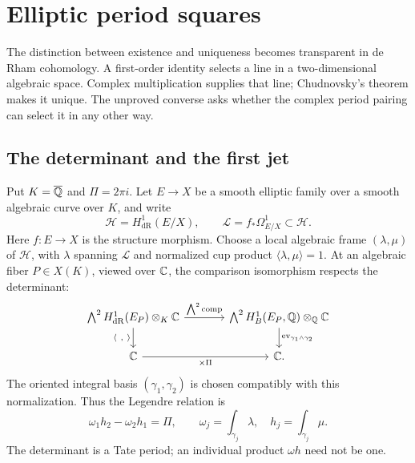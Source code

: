 \section{Elliptic period squares}\label{sec:general-period-square}

The distinction between existence and uniqueness becomes transparent in
de Rham cohomology. A first-order identity selects a line in a
two-dimensional algebraic space. Complex multiplication supplies that
line; Chudnovsky's theorem makes it unique. The unproved converse asks
whether the complex period pairing can select it in any other way.

\subsection{The determinant and the first jet}
Put $K=\overline{\mathbb Q}$ and $\Pi=2\pi i$. Let $E\to X$ be a smooth elliptic
family over a smooth algebraic curve over $K$, and write
\[
 \mathcal H=H^1_{\mathrm{dR}}(E/X),\qquad
 \mathcal L=f_*\Omega^1_{E/X}\subset\mathcal H.
\]
Here $f:E\to X$ is the structure morphism. Choose a local algebraic
frame $(\lambda,\mu)$ of $\mathcal H$, with $\lambda$ spanning
$\mathcal L$ and normalized cup product $\langle\lambda,\mu\rangle=1$.
At an algebraic fiber $P\in X(K)$, viewed over $\mathbb C$, the comparison
isomorphism respects the determinant:
\[
\begin{tikzcd}[column sep=large]
 \bigwedge^2 H^1_{\mathrm{dR}}(E_P)\otimes_K\C
   \arrow[r,"\bigwedge^2\mathrm{comp}"]
   \arrow[d,"{\langle\ ,\ \rangle}"']
 &\bigwedge^2 H^1_B(E_P,\Q)\otimes_\Q\C
   \arrow[d,"\mathrm{ev}_{\gamma_1\wedge\gamma_2}"]\\
 \C\arrow[r,"\times\Pi"']&\C .
\end{tikzcd}
\]
The oriented integral basis $(\gamma_1,\gamma_2)$ is chosen compatibly
with this normalization. Thus the Legendre relation is
\begin{equation}\label{eq:general-legendre}
 \omega_1h_2-\omega_2h_1=\Pi,
 \qquad \omega_j=\int_{\gamma_j}\lambda,\quad
 h_j=\int_{\gamma_j}\mu.
\end{equation}
The determinant is a Tate period; an individual product $\omega h$
need not be one.

